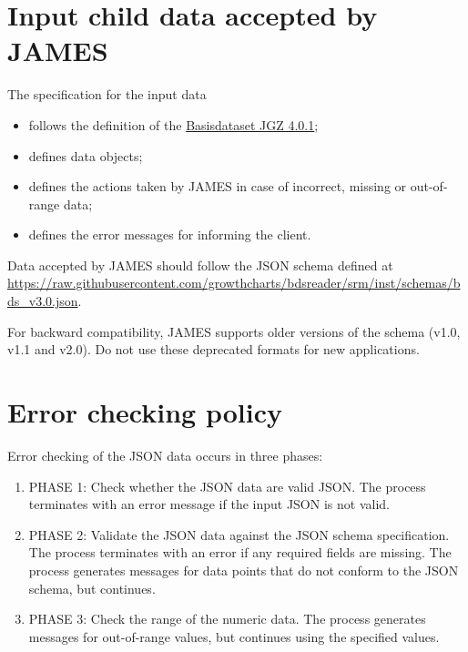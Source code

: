 \documentclass[
]{book}
\providecommand{\tightlist}{%
  \setlength{\itemsep}{0pt}\setlength{\parskip}{0pt}}
\begin{document}
\hypertarget{input-child-data-accepted-by-james}{%
\section{Input child data accepted by JAMES}\label{input-child-data-accepted-by-james}}

The specification for the input data

\begin{itemize}
\tightlist
\item
  follows the definition of the \href{https://decor.nictiz.nl/pub/jeugdgezondheidszorg/BDS401/}{Basisdataset JGZ 4.0.1};
\item
  defines data objects;
\item
  defines the actions taken by JAMES in case of incorrect, missing or out-of-range data;
\item
  defines the error messages for informing the client.
\end{itemize}

Data accepted by JAMES should follow the JSON schema defined at \url{https://raw.githubusercontent.com/growthcharts/bdsreader/srm/inst/schemas/bds_v3.0.json}.

For backward compatibility, JAMES supports older versions of the schema (v1.0, v1.1 and v2.0). Do not use these deprecated formats for new applications.

\hypertarget{error-checking-policy}{%
\section{Error checking policy}\label{error-checking-policy}}

Error checking of the JSON data occurs in three phases:

\begin{enumerate}
\def\labelenumi{\arabic{enumi}.}
\item
  PHASE 1: Check whether the JSON data are valid JSON. The process terminates
  with an error message if the input JSON is not valid.
\item
  PHASE 2: Validate the JSON data against the JSON schema specification. The process terminates
  with an error if any required fields are missing. The process generates messages for data points
  that do not conform to the JSON schema, but continues.
\item
  PHASE 3: Check the range of the numeric data. The process generates messages for out-of-range
  values, but continues using the specified values.
\end{enumerate}
\end{document}

